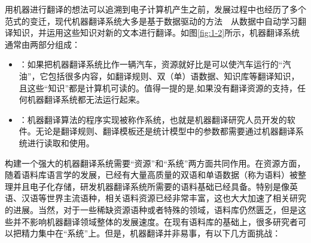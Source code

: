 \parinterval 用机器进行翻译的想法可以追溯到电子计算机产生之前，发展过程中也经历了多个范式的变迁，现代机器翻译系统大多是基于数据驱动的方法\ \dash\ 从数据中自动学习翻译知识，并运用这些知识对新的文本进行翻译。如图\ref{fig:1-2}所示，机器翻译系统通常由两部分组成：

\begin{itemize}
\vspace{0.5em}
\item {\small{}}：如果把机器翻译系统比作一辆汽车，资源就好比是可以使汽车运行的``汽油''，它包括很多内容，如翻译规则、双（单）语数据、知识库等翻译知识，且这些``知识''都是计算机可读的。值得一提的是,如果没有翻译资源的支持，任何机器翻译系统都无法运行起来。
\vspace{0.5em}
\item {\small{}}：机器翻译算法的程序实现被称作系统，也就是机器翻译研究人员开发的软件。无论是翻译规则、翻译模板还是统计模型中的参数都需要通过机器翻译系统进行读取和使用。
\vspace{0.5em}
\end{itemize}

\parinterval 构建一个强大的机器翻译系统需要``资源''和``系统''两方面共同作用。在资源方面，随着语料库语言学的发展，已经有大量高质量的双语和单语数据（称为语料）被整理并且电子化存储，研发机器翻译系统所需要的语料基础已经具备。特别是像英语、汉语等世界主流语种，相关语料资源已经非常丰富，这也大大加速了相关研究的进展。当然，对于一些稀缺资源语种或者特殊的领域，语料库仍然匮乏，但是这些并不影响机器翻译领域整体的发展速度。在现有语料库的基础上，很多研究者可以把精力集中在``系统''上。但是，机器翻译并非易事，有以下几方面挑战：


